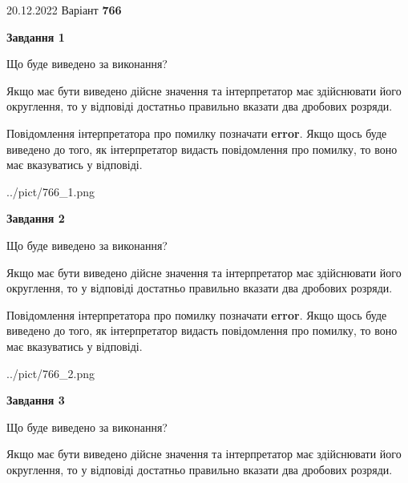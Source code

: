 \documentclass[12pt, ukrainian]{article}
\begin{document}
{20.12.2022 Варіант \No \textbf { 766 }\par}
{
\begin {Large}

{\begin {center}\textbf{Завдання 1}\end {center}}\par
Що буде виведено за виконання? \par

Якщо має бути виведено дійсне значення та інтерпретатор має здійснювати його округлення, 
то у відповіді достатньо правильно вказати два дробових розряди.

Повідомлення інтерпретатора про помилку позначати \textbf{error}.
Якщо щось буде виведено до того, як інтерпретатор видасть повідомлення про помилку, 
то воно має вказуватись у відповіді. \par

\begin{center}
	{../pict/766_1.png}
\end{center}
\newpage

{\begin {center}\textbf{Завдання 2}\end {center}}\par
Що буде виведено за виконання? \par

Якщо має бути виведено дійсне значення та інтерпретатор має здійснювати його округлення, 
то у відповіді достатньо правильно вказати два дробових розряди.

Повідомлення інтерпретатора про помилку позначати \textbf{error}.
Якщо щось буде виведено до того, як інтерпретатор видасть повідомлення про помилку, 
то воно має вказуватись у відповіді. \par

\begin{center}
	{../pict/766_2.png}
\end{center}
\newpage

{\begin {center}\textbf{Завдання 3}\end {center}}\par
Що буде виведено за виконання? \par

Якщо має бути виведено дійсне значення та інтерпретатор має здійснювати його округлення, 
то у відповіді достатньо правильно вказати два дробових розряди.


\end{Large}}
\end{document}
